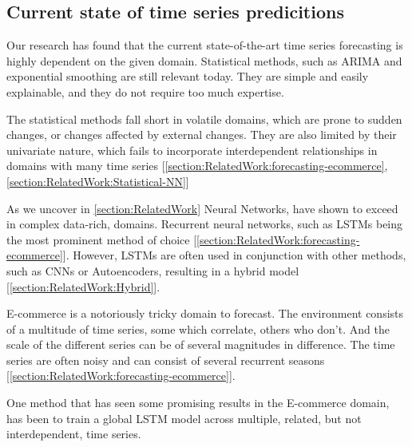 \subsection{Current state of time series predicitions}


Our research has found that the current state-of-the-art time series forecasting is highly dependent
on the given domain. Statistical methods, such as ARIMA and exponential smoothing
are still relevant today. They are simple and easily explainable, and they do not require
too much expertise.

The statistical methods fall short in volatile domains, which are prone to sudden changes,
or changes affected by external changes. They are also limited by their univariate nature, which fails to
incorporate interdependent relationships in domains with many time series [\autoref{section:RelatedWork:forecasting-ecommerce}, \autoref{section:RelatedWork:Statistical-NN}]

As we uncover in \autoref{section:RelatedWork} Neural Networks, have shown to exceed in complex data-rich, domains. Recurrent neural networks, such as LSTMs being the most
prominent method of choice [\autoref{section:RelatedWork:forecasting-ecommerce}]. However, LSTMs are often used in conjunction with other methods, such as CNNs or Autoencoders,
resulting in a hybrid model [\autoref{section:RelatedWork:Hybrid}].

E-commerce is a notoriously tricky domain to forecast. The environment consists of a multitude of time series,
some which correlate, others who don't. And the scale of the different series can be of several magnitudes in difference.
The time series are often noisy and can consist of several recurrent seasons [\autoref{section:RelatedWork:forecasting-ecommerce}].

One method that has seen some promising results in the E-commerce domain, has been to train a global LSTM model across multiple,
related, but not interdependent, time series.


